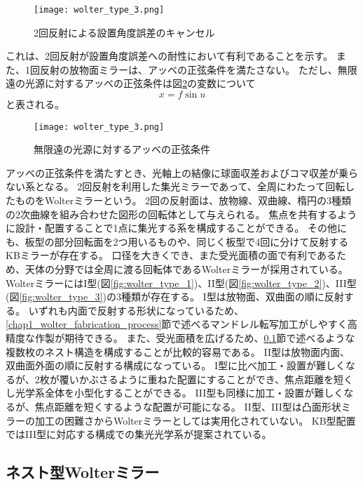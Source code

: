 \begin{figure}[b]
\centering
\texttt{[image: wolter\_type\_3.png]}
\caption{2回反射による設置角度誤差のキャンセル}
\label{fig:canceling_angle_error_by_two_reflections}
\end{figure}

これは、2回反射が設置角度誤差への耐性において有利であることを示す。
また、1回反射の放物面ミラーは、アッベの正弦条件を満たさない。
ただし、無限遠の光源に対するアッベの正弦条件は図\ref{fig:abbe_sine_condition_for_parallel_light}の変数について
\[
    x = f \sin u
\]
と表される。

\begin{figure}[b]
\centering
\texttt{[image: wolter\_type\_3.png]}
\caption{無限遠の光源に対するアッベの正弦条件}
\label{fig:abbe_sine_condition_for_parallel_light}
\end{figure}

アッベの正弦条件を満たすとき、光軸上の結像に球面収差およびコマ収差が乗らない系となる。
2回反射を利用した集光ミラーであって、全周にわたって回転したものをWolterミラーという。
2回の反射面は、放物線、双曲線、楕円の3種類の2次曲線を組み合わせた図形の回転体として与えられる。
焦点を共有するように設計・配置することで1点に集光する系を構成することができる。
その他にも、板型の部分回転面を2つ用いるものや、同じく板型で4回に分けて反射するKBミラーが存在する。
口径を大きくでき、また受光面積の面で有利であるため、天体の分野では全周に渡る回転体であるWolterミラーが採用されている。
WolterミラーにはI型(図\ref{fig:wolter_type_1})、II型(図\ref{fig:wolter_type_2})、III型(図\ref{fig:wolter_type_3})の3種類が存在する。
I型は放物面、双曲面の順に反射する。
いずれも内面で反射する形状になっているため、\ref{chap1_wolter_fabrication_process}節で述べるマンドレル転写加工がしやすく高精度な作製が期待できる。
また、受光面積を広げるため、\ref{chap1_nested_wolter_mirror}節で述べるような複数枚のネスト構造を構成することが比較的容易である。
II型は放物面内面、双曲面外面の順に反射する構成になっている。
I型に比べ加工・設置が難しくなるが、2枚が覆いかぶさるように重ねた配置にすることができ、焦点距離を短くし光学系全体を小型化することができる。
III型も同様に加工・設置が難しくなるが、焦点距離を短くするような配置が可能になる。
II型、III型は凸面形状ミラーの加工の困難さからWolterミラーとしては実用化されていない。
KB型配置ではIII型に対応する構成での集光光学系が提案されている。\cite{Yamada:20}

\subsection{ネスト型Wolterミラー}
\label{chap1_nested_wolter_mirror}

